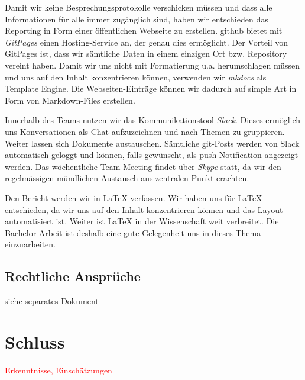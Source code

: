 \documentclass[a4paper,ngerman, 11pt, pagesize]{report}
\newcommand\Diskussionspunkt[1]{\textcolor{red}{#1}}
\begin{document}
Damit wir keine Besprechungsprotokolle verschicken müssen und dass alle Informationen für alle immer zugänglich sind, haben wir entschieden das Reporting in Form einer öffentlichen Webseite zu erstellen. github bietet mit \textit{GitPages} einen Hosting-Service an, der genau dies ermöglicht. Der Vorteil von GitPages ist, dass wir sämtliche Daten in einem einzigen Ort bzw. Repository vereint haben. Damit wir uns nicht mit Formatierung u.a. herumschlagen müssen und uns auf den Inhalt konzentrieren können, verwenden wir \textit{mkdocs} als Template Engine. Die Webseiten-Einträge können wir dadurch auf simple Art in Form von Markdown-Files erstellen.

Innerhalb des Teams nutzen wir das Kommunikationstool \textit{Slack}. Dieses ermöglich uns Konversationen als Chat aufzuzeichnen und nach Themen zu gruppieren. Weiter lassen sich Dokumente austauschen. Sämtliche git-Posts werden von Slack automatisch geloggt und können, falls gewünscht, als push-Notification angezeigt werden.
Das wöchentliche Team-Meeting findet über \textit{Skype} statt, da wir den regelmässigen mündlichen Austausch aus zentralen Punkt erachten.

Den Bericht werden wir in LaTeX verfassen. Wir haben uns für LaTeX entschieden, da wir uns auf den Inhalt konzentrieren können und das Layout automatisiert ist. Weiter ist LaTeX in der Wissenschaft weit verbreitet. Die Bachelor-Arbeit ist deshalb eine gute Gelegenheit uns in dieses Thema einzuarbeiten.


\section{Rechtliche Ansprüche}
siehe separates Dokument


\chapter{Schluss}
\Diskussionspunkt{Erkenntnisse, Einschätzungen}




{}	

\end{document}
